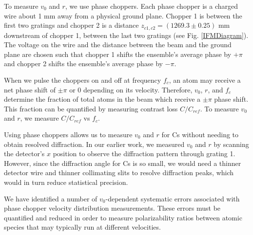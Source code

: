 \documentclass[twocolumn, prl,showpacs,superscriptaddress]{revtex4-1}   %
\newcommand{\figref}[1]{Fig. \ref{#1}}
\begin{document}
To measure $v_0$ and $r$, we use phase choppers. Each phase chopper is a charged wire about 1 mm away from a physical ground plane. Chopper 1 is between the first two gratings and chopper 2 is a distance $z_{c1,c2} = (1269.3 \pm 0.25)$ mm downstream of chopper 1, between the last two gratings (see \figref{IFMDiagram}). The voltage on the wire and the distance between the beam and the ground plane are chosen such that chopper 1 shifts the ensemble's average phase by $+\pi$ and chopper 2 shifts the ensemble's average phase by $-\pi$. 

When we pulse the choppers on and off at frequency $f_c$, an atom may receive a net phase shift of $\pm\pi$ or $0$ depending on its velocity. Therefore, $v_0$, $r$, and $f_c$ determine the fraction of total atoms in the beam which receive a $\pm\pi$ phase shift. This fraction can be quantified by measuring contrast loss $C/C_{ref}$. To measure $v_0$ and $r$, we measure $C/C_{ref}$ vs $f_c$.

Using phase choppers allows us to measure $v_0$ and $r$ for Cs without needing to obtain resolved diffraction. In our earlier work, we measured $v_0$ and $r$ by scanning the detector's $x$ position to observe the diffraction pattern through grating 1. However, since the diffraction angle for Cs is so small, we would need a thinner detector wire and thinner collimating slits to resolve diffraction peaks, which would in turn reduce statistical precision.

We have identified a number of $v_0$-dependent systematic errors associated with phase chopper velocity distribution measurements. These errors must be quantified and reduced in order to measure polarizability ratios between atomic species that may typically run at different velocities.
\end{document}
